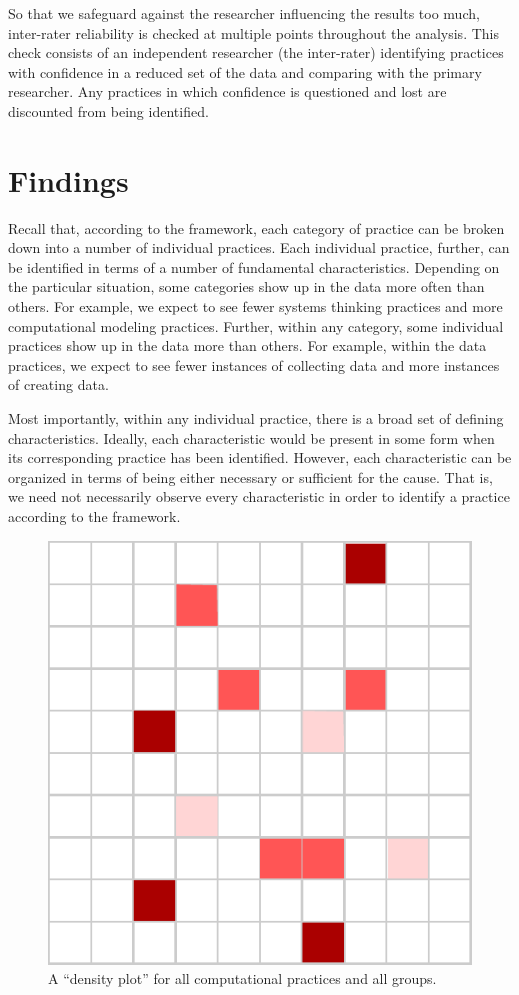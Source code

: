 \documentclass{msuphddissertation}
\begin{document}
\begin{doublespace}
So that we safeguard against the researcher influencing the results too much, inter-rater reliability is checked at multiple points throughout the analysis.  This check consists of an independent researcher (the inter-rater) identifying practices with confidence in a reduced set of the data and comparing with the primary researcher.  Any practices in which confidence is questioned and lost are discounted from being identified.

\section{Findings}

Recall that, according to the framework, each category of practice can be broken down into a number of individual practices.  Each individual practice, further, can be identified in terms of a number of fundamental characteristics.  Depending on the particular situation, some categories show up in the data more often than others.  For example, we expect to see fewer systems thinking practices and more computational modeling practices.  Further, within any category, some individual practices show up in the data more than others.  For example, within the data practices, we expect to see fewer instances of collecting data and more instances of creating data.

Most importantly, within any individual practice, there is a broad set of defining characteristics.  Ideally, each characteristic would be present in some form when its corresponding practice has been identified.  However, each characteristic can be organized in terms of being either necessary or sufficient for the cause.  That is, we need not necessarily observe every characteristic in order to identify a practice according to the framework.

\begin{figure}[ht]\centering
\includegraphics[scale=1]{./images/matrix.pdf}
\caption{A ``density plot'' for all computational practices and all groups.}\label{CH5:DensityPlot}
\end{figure}


\end{doublespace}
\end{document}
